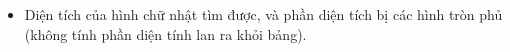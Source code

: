 \begin{itemize}
	\item 

       Diện tích của hình chữ nhật tìm được, và phần diện tích bị các hình tròn phủ (không tính phần diện tính lan ra khỏi bảng).      
\\
\end{itemize}

\